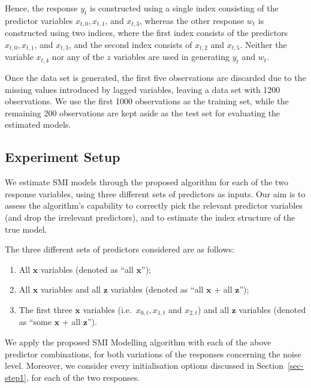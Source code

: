 \documentclass[
  11pt,
  a4paper,
]{article}
\providecommand{\tightlist}{%
  \setlength{\itemsep}{0pt}\setlength{\parskip}{0pt}}\usepackage{longtable,booktabs,array}
\begin{document}
Hence, the response \(y_{t}\) is constructed using a single index
consisting of the predictor variables \(x_{t,0}, x_{t,1}\), and
\(x_{t,3}\), whereas the other response \(w_{t}\) is constructed using
two indices, where the first index consists of the predictors
\(x_{t,0}, x_{t,1}\), and \(x_{t,3}\), and the second index consists of
\(x_{t,2}\) and \(x_{t,5}\). Neither the variable \(x_{t,4}\) nor any of
the \(z\) variables are used in generating \(y_{t}\) and \(w_{t}\).

Once the data set is generated, the first five observations are
discarded due to the missing values introduced by lagged variables,
leaving a data set with 1200 observations. We use the first 1000
observations as the training set, while the remaining 200 observations
are kept aside as the test set for evaluating the estimated models.

\subsection{Experiment Setup}\label{sec-exp}

We estimate SMI models through the proposed algorithm for each of the
two response variables, using three different sets of predictors as
inputs. Our aim is to assess the algorithm's capability to correctly
pick the relevant predictor variables (and drop the irrelevant
predictors), and to estimate the index structure of the true model.

The three different sets of predictors considered are as follows:

\begin{enumerate}
\def\labelenumi{\arabic{enumi}.}
\tightlist
\item
  All \(\bm{x}\) variables (denoted as ``all \(\bm{x}\)'');
\item
  All \(\bm{x}\) variables and all \(\bm{z}\) variables (denoted as
  ``all \(\bm{x}\) + all \(\bm{z}\)'');
\item
  The first three \(\bm{x}\) variables (i.e.~\(x_{0,t}, x_{1,t}\) and
  \(x_{2,t}\)) and all \(\bm{z}\) variables (denoted as ``some
  \(\bm{x}\) + all \(\bm{z}\)'').
\end{enumerate}

We apply the proposed SMI Modelling algorithm with each of the above
predictor combinations, for both variations of the responses concerning
the noise level. Moreover, we consider every initialisation options
discussed in Section~\ref{sec-step1}, for each of the two responses.
\end{document}
